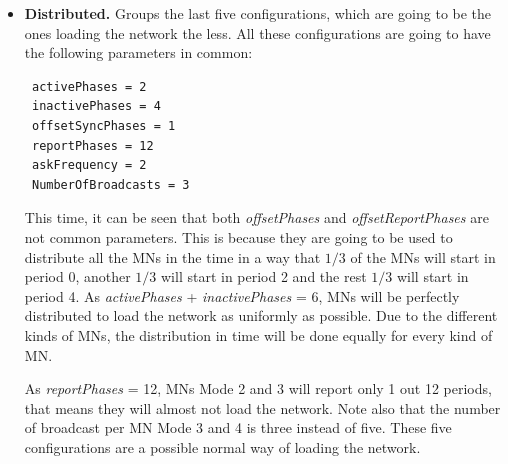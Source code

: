 \begin{itemize}
From this group, and attending to the number of \acp{MN} of each Mode (see Figure \ref{fig:ProtocolPhases}) these 5 configurations are proposed:
\begin{itemize}
 \item[-] \textbf{Config 1}: 15 \acp{MN} Mode 1, 15 \acp{MN} Mode 2, 15 \acp{MN} Mode 3 and 15 \acp{MN} Mode 4.
 \item[-] \textbf{Config 2}: 6 \acp{MN} Mode 1, 6 \acp{MN} Mode 2, 15 \acp{MN} Mode 3 and 33 \acp{MN} Mode 4.
 \item[-] \textbf{Config 3}: 6 \acp{MN} Mode 1, 6 \acp{MN} Mode 2, 33 \acp{MN} Mode 3 and 15 \acp{MN} Mode 4.
 \item[-] \textbf{Config 4}: 33 \acp{MN} Mode 1, 15 \acp{MN} Mode 2, 6 \acp{MN} Mode 3 and 6 \acp{MN} Mode 4.
 \item[-] \textbf{Config 5}: 15 \acp{MN} Mode 1, 33 \acp{MN} Mode 2, 6 \acp{MN} Mode 3 and 6 \acp{MN} Mode 4.
\end{itemize}
 \item \textbf{Distributed. }Groups the last five configurations, which are going to be the ones loading the network the less. All these
configurations are going to have the following parameters in common:
\begin{verbatim}
 activePhases = 2
 inactivePhases = 4
 offsetSyncPhases = 1
 reportPhases = 12
 askFrequency = 2
 NumberOfBroadcasts = 3
\end{verbatim}
This time, it can be seen that both \textit{offsetPhases} and \textit{offsetReportPhases} are not common parameters. This is because they are going to be
used to distribute all the \acp{MN} in the time in a way that $1/3$ of the \acp{MN} will start in period 0, another $1/3$ will start in period 2 and the 
rest $1/3$ will start in period 4. As \textit{activePhases} + \textit{inactivePhases} = 6, \acp{MN} will be perfectly distributed to load the network as 
uniformly as possible. Due to the different kinds of \acp{MN}, the distribution in time will be done equally for every kind of \ac{MN}.

As \textit{reportPhases} = 12, \acp{MN} Mode 2 and 3 will report only 1 out 12 periods, that means they will almost not load the network. Note also that 
the number of broadcast per \ac{MN} Mode 3 and 4 is three instead of five. These five configurations are a possible normal way of loading the network.


\end{itemize}
